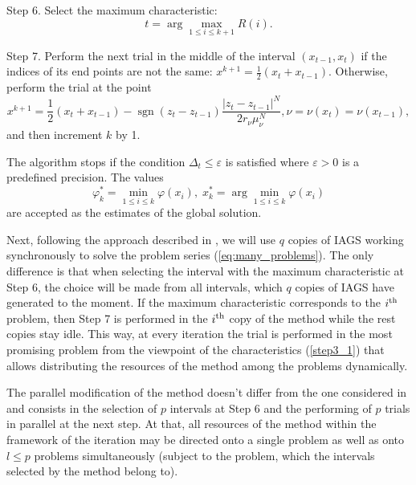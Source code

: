 \documentclass[runningheads]{llncs}
\begin{document}
Step 6. Select the maximum characteristic:
\begin{equation}
\label{step4}
t=\arg \max_{1\leqslant i \leqslant k+1}R(i).
\end{equation}

Step 7. Perform the next trial in the middle of the interval \((x_{t-1},x_{t})\) if the indices of its
end points are not the same: \(x^{k+1}={\frac {1}{2}}(x_{t}+x_{t-1})\).
Otherwise, perform the trial at the point
\begin{displaymath}
  x^{k+1}={\frac {1}{2}}(x_{t}+x_{t-1})-\operatorname {sgn}(z_{t}-z_{t-1}){\frac {|z_{t}-
z_{t-1}|^{N}}{2r_{\nu }\mu _{\nu }^{N}}},\nu =\nu (x_{t})=\nu (x_{t-1}),
\end{displaymath}
and then increment \(k\) by 1.

The algorithm stops if the condition \(\Delta_{t}\leqslant \varepsilon\) is satisfied where
\(\varepsilon>0\) is a predefined precision.
The values
\begin{equation}
\varphi_k^*=\min_{1\leqslant i \leqslant k}\varphi(x_i), \; x_k^*=\arg \min_{1\leqslant i \leqslant
k}\varphi(x_i)
\end{equation}
are accepted as the estimates of the global solution.

Next, following the approach described in \cite{BarkalovStrongin2018}, we will use \(q\) copies
of IAGS working synchronously to solve the problem series (\ref{eq:many_problems}).
The only difference is that when selecting the interval with the maximum characteristic at Step
6, the choice will be made from all intervals, which \(q\) copies of IAGS have generated to the
moment.
If the maximum characteristic corresponds to the \(i^{\rm th}\) problem, then Step 7 is
performed in the \(i^{\rm th}\) copy of the method while the rest copies stay idle.
This way, at every iteration the trial is performed in the most promising problem from the
viewpoint of the characteristics (\ref{step3_1}) that allows distributing the resources of the
method among the problems dynamically.

The parallel modification of the method doesn't differ from the one considered in
\cite{BarkalovStrongin2018} and consists in the selection of \(p\) intervals at Step 6 and the
performing of \(p\) trials in parallel at the next step.
At that, all resources of the method within the framework of the iteration may be directed onto
a single problem as well as onto \(l\leqslant p\) problems simultaneously (subject to the problem,
which the intervals selected by the method belong to).
\end{document}
